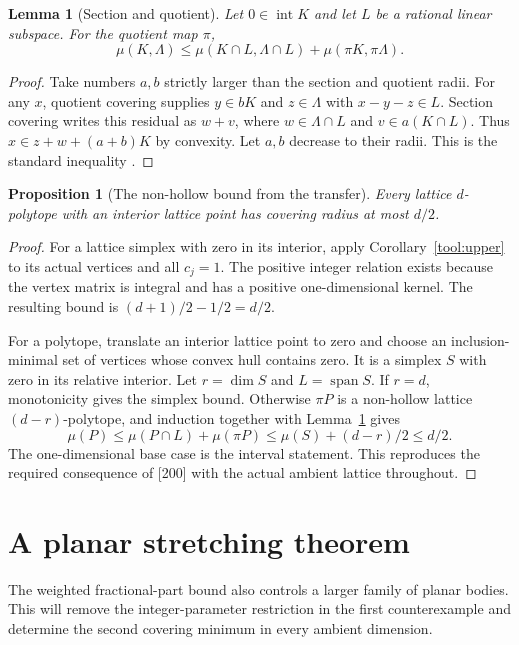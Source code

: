 \documentclass[11pt,a4paper]{article}
\newtheorem{lemma}[theorem]{Lemma}
\newtheorem{proposition}[theorem]{Proposition}
\theoremstyle{remark}\newtheorem{remark}[theorem]{Remark}
\DeclareMathOperator{\inter}{int}
\begin{document}
\begin{lemma}[Section and quotient]\label{tool:section}
Let $0\in\inter K$ and let $L$ be a rational linear subspace.
For the quotient map $\pi$,
\[
 \mu(K,\Lambda)\le
 \mu(K\cap L,\Lambda\cap L)+\mu(\pi K,\pi\Lambda).
\]
\end{lemma}
\begin{proof}
Take numbers $a,b$ strictly larger than the section and quotient
radii. For any $x$, quotient covering supplies $y\in bK$ and
$z\in\Lambda$ with $x-y-z\in L$. Section covering writes this
residual as $w+v$, where $w\in\Lambda\cap L$ and $v\in a(K\cap L)$.
Thus $x\in z+w+(a+b)K$ by convexity. Let $a,b$ decrease to their
radii. This is the standard inequality \cite[Lemma 2.1]{CSS}.
\end{proof}

\begin{proposition}[The non-hollow bound from the transfer]
\label{tool:nonhollow}
Every lattice $d$-polytope with an interior lattice point has
covering radius at most $d/2$.
\end{proposition}
\begin{proof}
For a lattice simplex with zero in its interior, apply
Corollary~\ref{tool:upper} to its actual vertices and all $c_j=1$.
The positive integer relation exists because the vertex matrix is
integral and has a positive one-dimensional kernel. The resulting
bound is $(d+1)/2-1/2=d/2$.

For a polytope, translate an interior lattice point to zero and
choose an inclusion-minimal set of vertices whose convex hull
contains zero. It is a simplex $S$ with zero in its relative
interior. Let $r=\dim S$ and $L=\operatorname{span}S$. If $r=d$,
monotonicity gives the simplex bound. Otherwise $\pi P$ is a
non-hollow lattice $(d-r)$-polytope, and induction together with
Lemma~\ref{tool:section} gives
\[
 \mu(P)\le\mu(P\cap L)+\mu(\pi P)
 \le\mu(S)+(d-r)/2\le d/2.
\]
The one-dimensional base case is the interval statement. This
reproduces the required consequence of [200] with the actual
ambient lattice throughout.
\end{proof}



\section{A planar stretching theorem}
\label{rr:sec:stretch}

The weighted fractional-part bound also controls a larger family of
planar bodies.  This will remove the integer-parameter restriction in
the first counterexample and determine the second covering minimum
in every ambient dimension.
\end{document}
